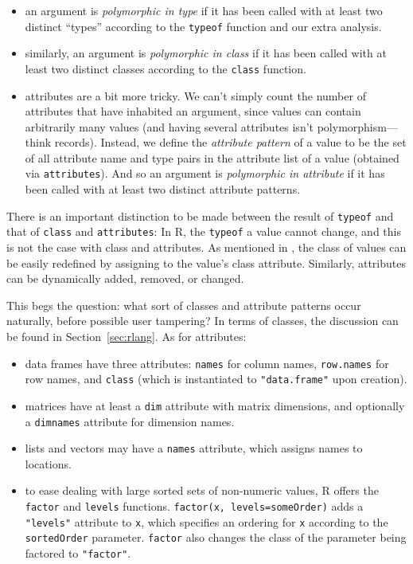 \documentclass[acmsmall,10pt,review,anonymous]{acmart}\settopmatter{printfolios=true,printccs=false,printacmref=false}
\newcommand{\code}[1]{\lstinline|#1|\xspace}
\begin{document}
\begin{itemize}

	\item an argument is {\it polymorphic in type} if it has been called with at least two distinct ``types'' according to the \code{typeof} function and our extra analysis.
	
	\item similarly, an argument is {\it polymorphic in class} if it has been called with at least two distinct classes according to the \code{class} function.
	
	\item attributes are a bit more tricky.
	We can't simply count the number of attributes that have inhabited an argument, since values can contain arbitrarily many values (and having several attributes isn't polymorphism---think records).
	Instead, we define the {\it attribute pattern} of a value to be the set of all attribute name and type pairs in the attribute list of a value (obtained via \code{attributes}).
	And so an argument is {\it polymorphic in attribute} if it has been called with at least two distinct attribute patterns.

\end{itemize}

There is an important distinction to be made between the result of \code{typeof} and that of \code{class} and \code{attributes}:
In R, the \code{typeof} a value cannot change, and this is not the case with class and attributes.
As mentioned in , the class of values can be easily redefined by assigning to the value's class attribute.
Similarly, attributes can be dynamically added, removed, or changed.

This begs the question: what sort of classes and attribute patterns occur naturally, before possible user tampering?
In terms of classes, the discussion can be found in Section~\ref{sec:rlang}.
As for attributes:

\begin{itemize}

	\item data frames have three attributes: {\tt names} for column names, {\tt row.names} for row names, and {\tt class} (which is instantiated to {\tt "data.frame"} upon creation).
	
	\item matrices have at least a {\tt dim} attribute with matrix dimensions, and optionally a {\tt dimnames} attribute for dimension names.

	\item lists and vectors may have a {\tt names} attribute, which assigns names to locations.
	
	\item to ease dealing with large sorted sets of non-numeric values, R offers the \code{factor} and \code{levels} functions.
	\code{factor(x, levels=someOrder)} adds a {\tt "levels"} attribute to \code{x}, which specifies an ordering for \code{x} according to the \code{sortedOrder} parameter.
	\code{factor} also changes the class of the parameter being factored to \code{"factor"}.

\end{itemize}
\end{document}
